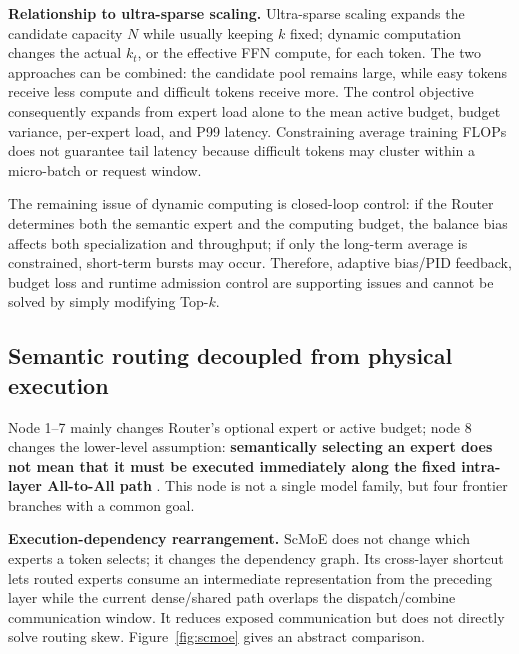 \documentclass[10pt,a4paper,fontset=none]{ctexart}
\newcommand{\term}[1]{\textbf{#1}}
\begin{document}
\textbf{Relationship to ultra-sparse scaling.} Ultra-sparse scaling expands the candidate capacity $N$ while usually keeping $k$ fixed; dynamic computation changes the actual $k_t$, or the effective FFN compute, for each token. The two approaches can be combined: the candidate pool remains large, while easy tokens receive less compute and difficult tokens receive more. The control objective consequently expands from expert load alone to the mean active budget, budget variance, per-expert load, and P99 latency. Constraining average training FLOPs does not guarantee tail latency because difficult tokens may cluster within a micro-batch or request window.

The remaining issue of dynamic computing is closed-loop control: if the Router determines both the semantic expert and the computing budget, the balance bias affects both specialization and throughput; if only the long-term average is constrained, short-term bursts may occur. Therefore, adaptive bias/PID feedback, budget loss and runtime admission control are supporting issues and cannot be solved by simply modifying Top-$k$.

\subsection{Semantic routing decoupled from physical execution}

Node 1--7 mainly changes Router's optional expert or active budget; node 8 changes the lower-level assumption: \term{ semantically selecting an expert does not mean that it must be executed immediately along the fixed intra-layer All-to-All path }. This node is not a single model family, but four frontier branches with a common goal.

\textbf{Execution-dependency rearrangement.} ScMoE does not change which experts a token selects; it changes the dependency graph. Its cross-layer shortcut lets routed experts consume an intermediate representation from the preceding layer while the current dense/shared path overlaps the dispatch/combine communication window\cite{cai2024scmoe}. It reduces exposed communication but does not directly solve routing skew. Figure~\ref{fig:scmoe} gives an abstract comparison.
\end{document}
